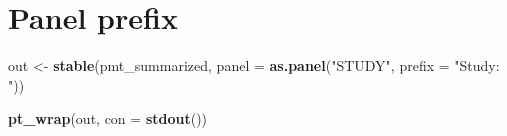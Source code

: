 \documentclass[
]{article}
\newenvironment{Shaded}{\begin{snugshade}}{\end{snugshade}}
\newcommand{\ControlFlowTok}[1]{\textcolor[rgb]{0.13,0.29,0.53}{\textbf{#1}}}
\newcommand{\DataTypeTok}[1]{\textcolor[rgb]{0.13,0.29,0.53}{#1}}
\newcommand{\KeywordTok}[1]{\textcolor[rgb]{0.13,0.29,0.53}{\textbf{#1}}}
\newcommand{\NormalTok}[1]{#1}
\newcommand{\OperatorTok}[1]{\textcolor[rgb]{0.81,0.36,0.00}{\textbf{#1}}}
\newcommand{\StringTok}[1]{\textcolor[rgb]{0.31,0.60,0.02}{#1}}
\begin{document}
\begin{Shaded}
\end{Shaded}

\clearpage

\hypertarget{panel-prefix}{%
\section{Panel prefix}\label{panel-prefix}}

\begin{Shaded}
\begin{Highlighting}[]
\NormalTok{out <-}\StringTok{ }\KeywordTok{stable}\NormalTok{(pmt_summarized, }\DataTypeTok{panel =} \KeywordTok{as.panel}\NormalTok{(}\StringTok{"STUDY"}\NormalTok{, }\DataTypeTok{prefix =} \StringTok{"Study: "}\NormalTok{))}

\KeywordTok{pt_wrap}\NormalTok{(out, }\DataTypeTok{con =} \KeywordTok{stdout}\NormalTok{()) }
\end{Highlighting}
\end{Shaded}
\end{document}
